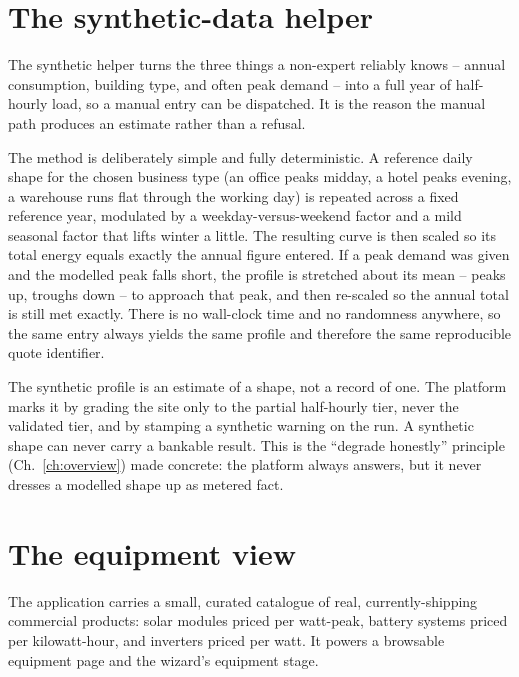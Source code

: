 \section{The synthetic-data helper}
\label{sec:synthetic}

The synthetic helper turns the three things a non-expert reliably knows -- annual consumption, building type, and often peak demand -- into a full year of half-hourly load, so a manual entry can be dispatched. It is the reason the manual path produces an estimate rather than a refusal.

The method is deliberately simple and fully deterministic. A reference daily shape for the chosen business type (an office peaks midday, a hotel peaks evening, a warehouse runs flat through the working day) is repeated across a fixed reference year, modulated by a weekday-versus-weekend factor and a mild seasonal factor that lifts winter a little. The resulting curve is then scaled so its total energy equals exactly the annual figure entered. If a peak demand was given and the modelled peak falls short, the profile is stretched about its mean -- peaks up, troughs down -- to approach that peak, and then re-scaled so the annual total is still met exactly. There is no wall-clock time and no randomness anywhere, so the same entry always yields the same profile and therefore the same reproducible quote identifier.

\begin{keyidea}
The synthetic profile is an estimate of a shape, not a record of one. The platform marks it by grading the site only to the partial half-hourly tier, never the validated tier, and by stamping a synthetic warning on the run. A synthetic shape can never carry a bankable result. This is the ``degrade honestly'' principle (Ch.~\ref{ch:overview}) made concrete: the platform always answers, but it never dresses a modelled shape up as metered fact.
\end{keyidea}

\section{The equipment view}

The application carries a small, curated catalogue of real, currently-shipping commercial products: solar modules priced per watt-peak, battery systems priced per kilowatt-hour, and inverters priced per watt. It powers a browsable equipment page and the wizard's equipment stage.

